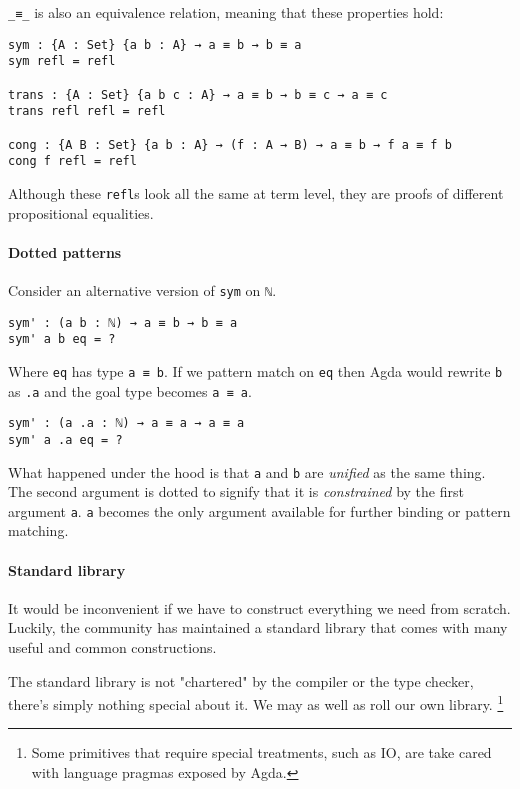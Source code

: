 \documentclass[12pt, a4paper]{article}
\begin{document}
{\lstinline|_≡_|} is also an equivalence relation, meaning that these properties
hold:

\begin{lstlisting}
sym : {A : Set} {a b : A} → a ≡ b → b ≡ a
sym refl = refl

trans : {A : Set} {a b c : A} → a ≡ b → b ≡ c → a ≡ c
trans refl refl = refl

cong : {A B : Set} {a b : A} → (f : A → B) → a ≡ b → f a ≡ f b
cong f refl = refl
\end{lstlisting}

Although these {\lstinline|refl|}s look all the same at term level, they
are proofs of different propositional equalities.

\paragraph{Dotted patterns}

Consider an alternative version of {\lstinline|sym|} on {\lstinline|ℕ|}.

\begin{lstlisting}
sym' : (a b : ℕ) → a ≡ b → b ≡ a
sym' a b eq = ?
\end{lstlisting}

Where {\lstinline|eq|} has type {\lstinline|a ≡ b|}.
If we pattern match on {\lstinline|eq|} then Agda would rewrite {\lstinline|b|}
as {\lstinline|.a|} and the goal type becomes {\lstinline|a ≡ a|}.

\begin{lstlisting}
sym' : (a .a : ℕ) → a ≡ a → a ≡ a
sym' a .a eq = ?
\end{lstlisting}

What happened under the hood is that {\lstinline|a|} and {\lstinline|b|} are
\textit{unified} as the same thing. The second argument is dotted to signify that
it is \textit{constrained} by the first argument {\lstinline|a|}. {\lstinline|a|}
becomes the only argument available for further binding or pattern matching.

\paragraph{Standard library}

It would be inconvenient if we have to construct everything we need from scratch.
Luckily, the community has maintained a standard library that comes with many useful
and common constructions.

The standard library is not "chartered" by the compiler or the type checker,
there's simply nothing special about it. We may as well as roll our own library.
\footnote{Some primitives that require special treatments, such as IO, are take cared with
language pragmas exposed by Agda.}
\end{document}
